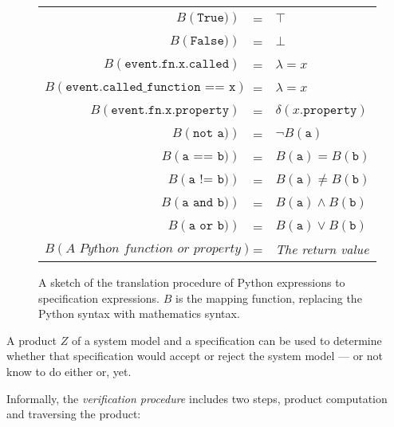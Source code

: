 \begin{figure}[h!]
	\begin{minipage}{0.9\textwidth}
		\centering
    \begin{tabular}{r c l}
      $B(\texttt{True)})$ & = & $\top$ \\
      $B(\texttt{False)})$ & = & $\bot$ \\
      $B(\texttt{event.fn.x.called})$ & = & $\lambda = x$ \\
      $B(\texttt{event.called\_function == x})$ & = & $\lambda = x$ \\
      $B(\texttt{event.fn.x.property})$ & = & $\delta(x.\texttt{property})$ \\
      $B(\texttt{not a)})$ & = & $\neg B(\texttt{a})$ \\
      $B(\texttt{a == b)})$ & = & $B(\texttt{a}) = B(\texttt{b})$ \\
      $B(\texttt{a != b)})$ & = & $B(\texttt{a}) \neq B(\texttt{b})$ \\
      $B(\texttt{a and b)})$ & = & $B(\texttt{a}) \wedge B(\texttt{b})$ \\
      $B(\texttt{a or b)})$ & = & $B(\texttt{a}) \vee B(\texttt{b})$ \\
      $B(\textit{A Python function or property})$ & = & \textit{The return value} \\
    \end{tabular}
  \end{minipage}
  \caption{A sketch of the translation procedure of Python expressions to
    specification expressions. $B$ is the mapping function, replacing the
    Python syntax with mathematics syntax.}
  \label{figure-semantics-translation}
\end{figure}



A product $Z$ of a system model and a specification can be used to determine
whether that specification would accept or reject the system model --- or not
know to do either or, yet.

Informally, the \textit{verification procedure} includes two steps, product
computation and traversing the product:

